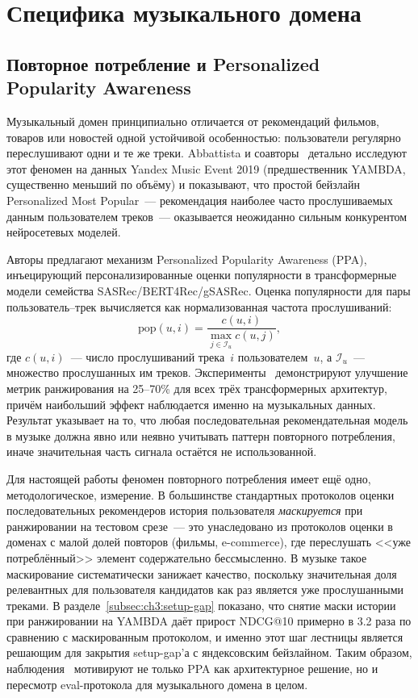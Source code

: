 \section{Специфика музыкального домена}
\label{sec:ch1:music-domain}

\subsection{Повторное потребление и Personalized Popularity Awareness}
\label{subsec:ch1:repeated}

Музыкальный домен принципиально отличается от рекомендаций фильмов, товаров или новостей одной устойчивой особенностью: пользователи регулярно переслушивают одни и те же треки. Abbattista и соавторы~\cite{abbattista2024sequential} детально исследуют этот феномен на данных Yandex Music Event 2019 (предшественник YAMBDA, существенно меньший по объёму) и показывают, что простой бейзлайн Personalized Most Popular~--- рекомендация наиболее часто прослушиваемых данным пользователем треков~--- оказывается неожиданно сильным конкурентом нейросетевых моделей.

Авторы предлагают механизм Personalized Popularity Awareness (PPA), инъецирующий персонализированные оценки популярности в трансформерные модели семейства SASRec/BERT4Rec/gSASRec. Оценка популярности для пары пользователь--трек вычисляется как нормализованная частота прослушиваний:
\begin{equation*}
    \mathrm{pop}(u, i) = \frac{c(u, i)}{\max_{j \in \mathcal{I}_u} c(u, j)},
\end{equation*}
где $c(u, i)$~--- число прослушиваний трека~$i$ пользователем~$u$, а $\mathcal{I}_u$~--- множество прослушанных им треков. Эксперименты~\cite{abbattista2024sequential} демонстрируют улучшение метрик ранжирования на 25--70\% для всех трёх трансформерных архитектур, причём наибольший эффект наблюдается именно на музыкальных данных. Результат указывает на то, что любая последовательная рекомендательная модель в музыке должна явно или неявно учитывать паттерн повторного потребления, иначе значительная часть сигнала остаётся не использованной.

Для настоящей работы феномен повторного потребления имеет ещё одно, методологическое, измерение. В большинстве стандартных протоколов оценки последовательных рекомендеров история пользователя \emph{маскируется} при ранжировании на тестовом срезе~--- это унаследовано из протоколов оценки в доменах с малой долей повторов (фильмы, e-commerce), где переслушать <<уже потреблённый>> элемент содержательно бессмысленно. В музыке такое маскирование систематически занижает качество, поскольку значительная доля релевантных для пользователя кандидатов как раз является уже прослушанными треками. В разделе~\ref{subsec:ch3:setup-gap} показано, что снятие маски истории при ранжировании на YAMBDA даёт прирост NDCG@10 примерно в 3.2 раза по сравнению с маскированным протоколом, и именно этот шаг лестницы является решающим для закрытия setup-gap'а с яндексовским бейзлайном. Таким образом, наблюдения~\cite{abbattista2024sequential} мотивируют не только PPA как архитектурное решение, но и пересмотр eval-протокола для музыкального домена в целом.

